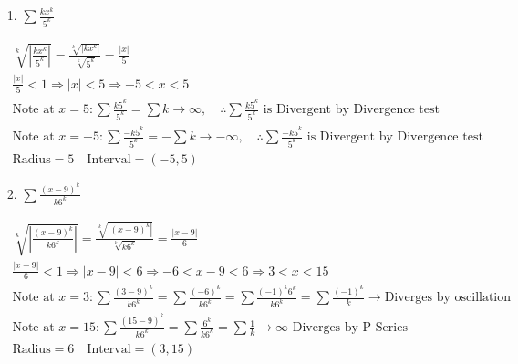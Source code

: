     \begin{itemize}
        \item [1.] $\sum\frac{kx^{k}}{5^{k}}$
        \\
        \begin{mdframed}
            \begin{equation*}
                \begin{gathered}
                    \sqrt[k]{\left|\frac{kx^{k}}{5^{k}}\right|} =
                \frac{\sqrt[k]{|kx^{k}|}}{\sqrt[k]{5^{k}}} =
                \frac{|x|}{5}                                                   \\
                \frac{|x|}{5} < 1 \Rightarrow |x| < 5 \Rightarrow -5 < x < 5    \\
                \text{Note at } x = 5: \sum\frac{k5^{k}}{5^{k}} = \sum k \rightarrow \infty, \quad
                \therefore \sum\frac{k5^{k}}{5^{k}} \text{ is Divergent by Divergence test}        
                \\
                \text{Note at } x = -5: \sum\frac{-k5^{k}}{5^{k}} = -\sum k \rightarrow -\infty, \quad
                \therefore \sum\frac{-k5^{k}}{5^{k}} \text{ is Divergent by Divergence test}        
                \\
                \text{Radius} = 5 \quad \text{Interval} = (-5,5)
                \end{gathered}
            \end{equation*}
        \end{mdframed}

        \item [2.] $\sum\frac{(x-9)^{k}}{k6^{k}}$
        \\
        \begin{mdframed}
            \begin{equation*}
                \begin{gathered}
                    \sqrt[k]{\left|\frac{(x-9)^{k}}{k6^{k}}\right|} =
                    \frac{\sqrt[k]{|(x-9)^{k}|}}{\sqrt[k]{k6^{k}}} =
                    \frac{|x-9|}{6}                                         \\
                    \frac{|x-9|}{6} < 1 \Rightarrow |x-9| < 6 \Rightarrow 
                    -6 < x-9 < 6 \Rightarrow 3 < x < 15                     \\
                    \text{Note at } x=3: \sum\frac{(3-9)^{k}}{k6^{k}} =
                    \sum\frac{(-6)^{k}}{k6^{k}} = 
                    \sum\frac{(-1)^{k}6^{k}}{k6^{k}} =
                    \sum\frac{(-1)^{k}}{k} \rightarrow 
                    \text{Diverges by oscillation}                          \\
                    \text{Note at } x=15: \sum\frac{(15-9)^{k}}{k6^{k}} =
                    \sum\frac{6^{k}}{k6^{k}} = 
                    \sum\frac{1}{k} \rightarrow \infty
                    \text{ Diverges by P-Series}                            \\
                    \text{Radius} = 6 \quad \text{Interval} = (3,15)
                \end{gathered}
            \end{equation*}
        \end{mdframed}


\end{itemize}
